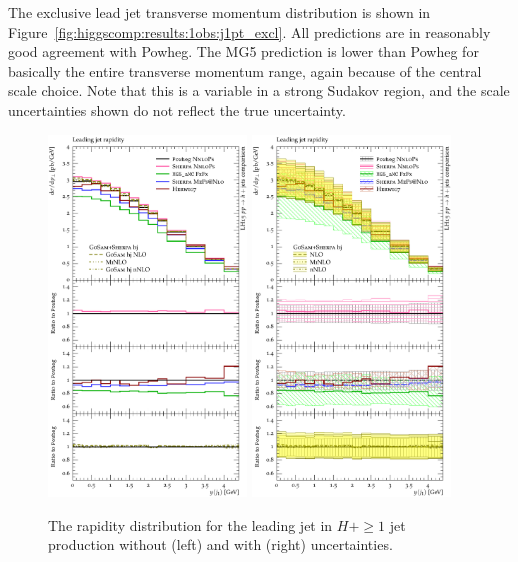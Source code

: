The exclusive lead jet transverse momentum distribution is shown in
Figure~\ref{fig:higgscomp:results:1obs:j1pt_excl}. All predictions are
in reasonably good agreement with Powheg. The MG5 prediction is lower
than Powheg for basically the entire transverse momentum range, again
because of the central scale choice. Note that this is a variable in a
strong Sudakov region, and the scale uncertainties shown do not
reflect the true uncertainty.

\begin{figure}[t!]
  \centering
  \includegraphics[width=0.47\textwidth]{figures/hjetscomp_u_jet1_y.pdf}
  \hfill
  \includegraphics[width=0.47\textwidth]{figures/hjetscomp_jet1_y.pdf}
  \caption{
    The rapidity distribution for the leading jet in $H+\ge1$ jet production
    without (left) and with (right) uncertainties. 
    \label{fig:higgscomp:results:1obs:j1y}
  }
\end{figure}

